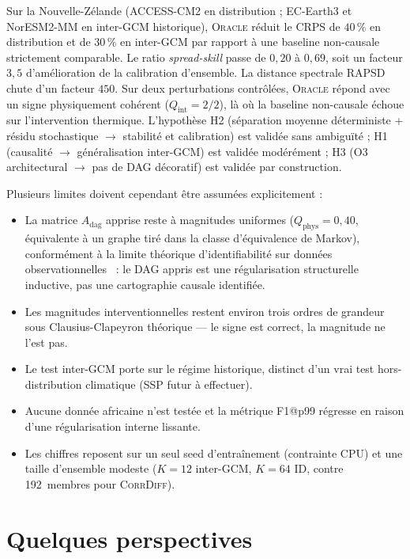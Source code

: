 \documentclass[14pt,a4paper,openany]{extreport}
\newcommand{\Oracle}{\textsc{Oracle}}
\newcommand{\CorrDiff}{\textsc{CorrDiff}}
\newcommand{\Adag}{\ensuremath{A_{\mathrm{dag}}}}
\begin{document}
Sur la Nouvelle-Zélande (ACCESS-CM2 en distribution ; EC-Earth3 et NorESM2-MM en inter-GCM historique), \Oracle{} réduit le CRPS de $40\,\%$ en distribution et de $30\,\%$ en inter-GCM par rapport à une baseline non-causale strictement comparable. Le ratio \emph{spread-skill} passe de $0{,}20$ à $0{,}69$, soit un facteur $3{,}5$ d'amélioration de la calibration d'ensemble. La distance spectrale RAPSD chute d'un facteur $450$. Sur deux perturbations contrôlées, \Oracle{} répond avec un signe physiquement cohérent ($Q_{\mathrm{int}}=2/2$), là où la baseline non-causale échoue sur l'intervention thermique. L'hypothèse H2 (séparation moyenne déterministe + résidu stochastique $\to$ stabilité et calibration) est validée sans ambiguïté ; H1 (causalité $\to$ généralisation inter-GCM) est validée modérément ; H3 (O3 architectural $\to$ pas de DAG décoratif) est validée par construction.

Plusieurs limites doivent cependant être assumées explicitement :
\begin{itemize}[leftmargin=1.2em, itemsep=2pt]
    \item La matrice $\Adag$ apprise reste à magnitudes uniformes ($Q_{\mathrm{phys}} = 0{,}40$, équivalente à un graphe tiré dans la classe d'équivalence de Markov), conformément à la limite théorique d'identifiabilité sur données observationnelles~\cite{pearl_causality_2009} : le DAG appris est une régularisation structurelle inductive, pas une cartographie causale identifiée.
    \item Les magnitudes interventionnelles restent environ trois ordres de grandeur sous Clausius-Clapeyron théorique --- le signe est correct, la magnitude ne l'est pas.
    \item Le test inter-GCM porte sur le régime historique, distinct d'un vrai test hors-distribution climatique (SSP futur à effectuer).
    \item Aucune donnée africaine n'est testée et la métrique F1@p99 régresse en raison d'une régularisation interne lissante.
    \item Les chiffres reposent sur un seul seed d'entraînement (contrainte CPU) et une taille d'ensemble modeste ($K=12$ inter-GCM, $K=64$ ID, contre 192~membres pour \CorrDiff{}).
\end{itemize}

\section*{Quelques perspectives}
\label{concl:persp}
\end{document}
